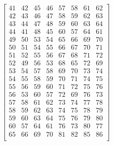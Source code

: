 \documentclass[10pt]{article}
\begin{document}
\begin{equation}
\begin{bmatrix}
41 & 42 & 45 & 46 & 57 & 58 & 61 & 62\\
42 & 43 & 46 & 47 & 58 & 59 & 62 & 63\\
43 & 44 & 47 & 48 & 59 & 60 & 63 & 64\\
44 & 41 & 48 & 45 & 60 & 57 & 64 & 61\\
49 & 50 & 53 & 54 & 65 & 66 & 69 & 70\\
50 & 51 & 54 & 55 & 66 & 67 & 70 & 71\\
51 & 52 & 55 & 56 & 67 & 68 & 71 & 72\\
52 & 49 & 56 & 53 & 68 & 65 & 72 & 69\\
53 & 54 & 57 & 58 & 69 & 70 & 73 & 74\\
54 & 55 & 58 & 59 & 70 & 71 & 74 & 75\\
55 & 56 & 59 & 60 & 71 & 72 & 75 & 76\\
56 & 53 & 60 & 57 & 72 & 69 & 76 & 73\\
57 & 58 & 61 & 62 & 73 & 74 & 77 & 78\\
58 & 59 & 62 & 63 & 74 & 75 & 78 & 79\\
59 & 60 & 63 & 64 & 75 & 76 & 79 & 80\\
60 & 57 & 64 & 61 & 76 & 73 & 80 & 77\\
65 & 66 & 69 & 70 & 81 & 82 & 85 & 86\\
\end{bmatrix}
\end{equation}
\end{document}

